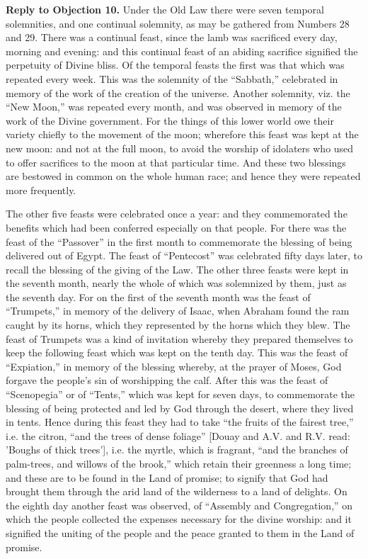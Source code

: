 \textbf{Reply to Objection 10.} Under the Old Law there were seven temporal solemnities, and one continual solemnity, as may be gathered from Numbers 28 and 29. There was a continual feast, since the lamb was sacrificed every day, morning and evening: and this continual feast of an abiding sacrifice signified the perpetuity of Divine bliss. Of the temporal feasts the first was that which was repeated every week. This was the solemnity of the ``Sabbath,'' celebrated in memory of the work of the creation of the universe. Another solemnity, viz. the ``New Moon,'' was repeated every month, and was observed in memory of the work of the Divine government. For the things of this lower world owe their variety chiefly to the movement of the moon; wherefore this feast was kept at the new moon: and not at the full moon, to avoid the worship of idolaters who used to offer sacrifices to the moon at that particular time. And these two blessings are bestowed in common on the whole human race; and hence they were repeated more frequently.

The other five feasts were celebrated once a year: and they commemorated the benefits which had been conferred especially on that people. For there was the feast of the ``Passover'' in the first month to commemorate the blessing of being delivered out of Egypt. The feast of ``Pentecost'' was celebrated fifty days later, to recall the blessing of the giving of the Law. The other three feasts were kept in the seventh month, nearly the whole of which was solemnized by them, just as the seventh day. For on the first of the seventh month was the feast of ``Trumpets,'' in memory of the delivery of Isaac, when Abraham found the ram caught by its horns, which they represented by the horns which they blew. The feast of Trumpets was a kind of invitation whereby they prepared themselves to keep the following feast which was kept on the tenth day. This was the feast of ``Expiation,'' in memory of the blessing whereby, at the prayer of Moses, God forgave the people's sin of worshipping the calf. After this was the feast of ``Scenopegia'' or of ``Tents,'' which was kept for seven days, to commemorate the blessing of being protected and led by God through the desert, where they lived in tents. Hence during this feast they had to take ``the fruits of the fairest tree,'' i.e. the citron, ``and the trees of dense foliage'' [Douay and A.V. and R.V. read: 'Boughs of thick trees'], i.e. the myrtle, which is fragrant, ``and the branches of palm-trees, and willows of the brook,'' which retain their greenness a long time; and these are to be found in the Land of promise; to signify that God had brought them through the arid land of the wilderness to a land of delights. On the eighth day another feast was observed, of ``Assembly and Congregation,'' on which the people collected the expenses necessary for the divine worship: and it signified the uniting of the people and the peace granted to them in the Land of promise.


